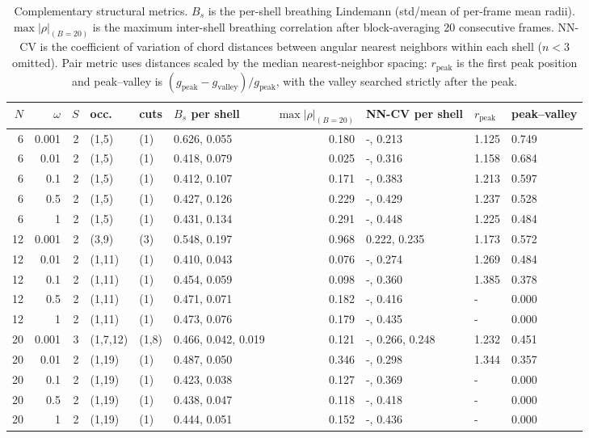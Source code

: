 \begin{table}[t]
\centering
\small
\setlength{\tabcolsep}{3.5pt}
\renewcommand{\arraystretch}{1.15}
\begin{adjustbox}{max width=\textwidth}
\begin{tabular}{rrrlllrlll}
\toprule
$N$ & $\omega$ & $S$ & occ. & cuts & $B_s$ per shell & $\max|\rho|_{(B=20)}$ & NN-CV per shell & $r_{\mathrm{peak}}$ & peak--valley \\
\midrule
6 & 0.001 & 2 & (1,5) & (1) & 0.626, 0.055 & 0.180 & -, 0.213 & 1.125 & 0.749 \\
6 & 0.01 & 2 & (1,5) & (1) & 0.418, 0.079 & 0.025 & -, 0.316 & 1.158 & 0.684 \\
6 & 0.1 & 2 & (1,5) & (1) & 0.412, 0.107 & 0.171 & -, 0.383 & 1.213 & 0.597 \\
6 & 0.5 & 2 & (1,5) & (1) & 0.427, 0.126 & 0.229 & -, 0.429 & 1.237 & 0.528 \\
6 & 1 & 2 & (1,5) & (1) & 0.431, 0.134 & 0.291 & -, 0.448 & 1.225 & 0.484 \\
12 & 0.001 & 2 & (3,9) & (3) & 0.548, 0.197 & 0.968 & 0.222, 0.235 & 1.173 & 0.572 \\
12 & 0.01 & 2 & (1,11) & (1) & 0.410, 0.043 & 0.076 & -, 0.274 & 1.269 & 0.484 \\
12 & 0.1 & 2 & (1,11) & (1) & 0.454, 0.059 & 0.098 & -, 0.360 & 1.385 & 0.378 \\
12 & 0.5 & 2 & (1,11) & (1) & 0.471, 0.071 & 0.182 & -, 0.416 & - & 0.000 \\
12 & 1 & 2 & (1,11) & (1) & 0.473, 0.076 & 0.179 & -, 0.435 & - & 0.000 \\
20 & 0.001 & 3 & (1,7,12) & (1,8) & 0.466, 0.042, 0.019 & 0.121 & -, 0.266, 0.248 & 1.232 & 0.451 \\
20 & 0.01 & 2 & (1,19) & (1) & 0.487, 0.050 & 0.346 & -, 0.298 & 1.344 & 0.357 \\
20 & 0.1 & 2 & (1,19) & (1) & 0.423, 0.038 & 0.127 & -, 0.369 & - & 0.000 \\
20 & 0.5 & 2 & (1,19) & (1) & 0.438, 0.047 & 0.118 & -, 0.418 & - & 0.000 \\
20 & 1 & 2 & (1,19) & (1) & 0.444, 0.051 & 0.152 & -, 0.436 & - & 0.000 \\
\bottomrule
\end{tabular}
\end{adjustbox}
\caption{Complementary structural metrics. $B_s$ is the per-shell breathing Lindemann (std/mean of per-frame mean radii). $\max|\rho|_{(B=20)}$ is the maximum inter-shell breathing correlation after block-averaging 20 consecutive frames. NN-CV is the coefficient of variation of chord distances between angular nearest neighbors within each shell ($n<3$ omitted). Pair metric uses distances scaled by the median nearest-neighbor spacing: $r_{\mathrm{peak}}$ is the first peak position and peak--valley is $(g_{\mathrm{peak}}-g_{\mathrm{valley}})/g_{\mathrm{peak}}$, with the valley searched strictly after the peak.}
\label{tab:shell_complement}
\end{table}
